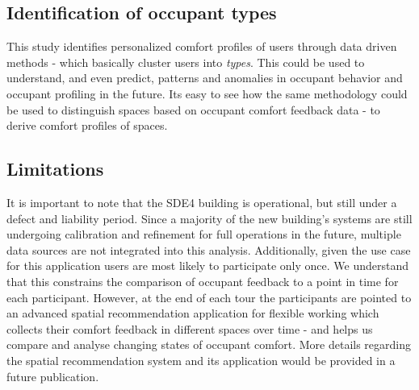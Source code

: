 \subsection{Identification of occupant types}

This study identifies personalized comfort profiles of users through data driven methods - which basically cluster users into \emph{types}. This could be used to understand, and even predict, patterns and anomalies in occupant behavior and occupant profiling in the future. Its easy to see how the same methodology could be used to distinguish spaces based on occupant comfort feedback data - to derive comfort profiles of spaces.


\subsection{Limitations}
It is important to note that the SDE4 building is operational, but still under a defect and liability period. Since a majority of the new building's systems are still undergoing calibration and refinement for full operations in the future, multiple data sources are not integrated into this analysis. Additionally, given the use case for this application users are most likely to participate only once. We understand that this constrains the comparison of occupant feedback to a point in time for each participant. However, at the end of each tour the participants are pointed to an advanced spatial recommendation application for flexible working which collects their comfort feedback in different spaces over time - and helps us compare and analyse changing states of occupant comfort. More details regarding the spatial recommendation system and its application would be provided in a future publication.










